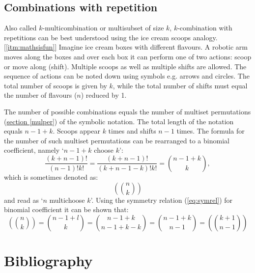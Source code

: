 \documentclass{article}
\begin{document}
\subsection{Combinations with repetition}

Also called $k$\nobreakdash-\hspace{0pt}multicombination or multisubset of size $k$, $k$\nobreakdash-\hspace{0pt}combination with repetitions can be best understood using the ice cream scoops analogy.\hyperref[itm:mathsisfun]{[\ref*{itm:mathsisfun}]}
Imagine ice cream boxes with different flavours.
A robotic arm moves along the boxes and over each box it can perform one of two actions: scoop or move along (shift).
Multiple scoops as well as multiple shifts are allowed.
The sequence of actions can be noted down using symbols e.g. arrows and circles.
The total number of scoops is given by $k$, while the total number of shifts must equal the number of flavours ($n$) reduced by 1.

The number of possible combinations equals the number of multiset permutations (\hyperref[mulper]{section \ref*{mulper}}) of the symbolic notation.
The total length of the notation equals $n-1+k$.
Scoops appear $k$ times and shifts $n-1$ times.
The formula for the number of such multiset permutations can be rearranged to a binomial coefficient, namely `$n-1+k$ choose $k$':
\begin{equation}
    \frac{(k+n-1)!}{(n-1)!k!} = \frac{(k+n-1)!}{(k+n-1-k)!k!} = \binom{n-1+k}{k},
\end{equation}
which is sometimes denoted as:
\begin{equation*}
    \left(\!\!\!\binom{n}{k}\!\!\!\right)
\end{equation*}
and read as `$n$ multichoose $k$'. Using the symmetry relation (\hyperref[eq:symrel]{\ref*{eq:symrel}}) for binomial coefficient it can be shown that:
\begin{equation}
    \left(\!\!\!\binom{n}{k}\!\!\!\right) = \binom{n-1+l}{k} = \binom{n-1+k}{n-1+k-k} = \binom{n-1+k}{n-1} = \left(\!\!\!\binom{k+1}{n-1}\!\!\!\right)
\end{equation}

\section*{Bibliography}
\end{document}
